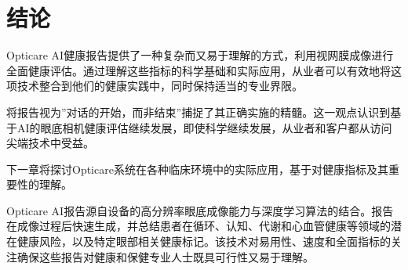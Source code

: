 \documentclass[
  Letterpaper,
]{scrbook}
\begin{document}
\section{结论}\label{ux7ed3ux8bba}

Opticare
AI健康报告提供了一种复杂而又易于理解的方式，利用视网膜成像进行全面健康评估。通过理解这些指标的科学基础和实际应用，从业者可以有效地将这项技术整合到他们的健康实践中，同时保持适当的专业界限。

将报告视为''对话的开始，而非结束''捕捉了其正确实施的精髓。这一观点认识到基于AI的眼底相机健康评估继续发展，即使科学继续发展，从业者和客户都从访问尖端技术中受益。

下一章将探讨Opticare系统在各种临床环境中的实际应用，基于对健康指标及其重要性的理解。

Opticare
AI报告源自设备的高分辨率眼底成像能力与深度学习算法的结合。报告在成像过程后快速生成，并总结患者在循环、认知、代谢和心血管健康等领域的潜在健康风险，以及特定眼部相关健康标记。该技术对易用性、速度和全面指标的关注确保这些报告对健康和保健专业人士既具可行性又易于理解。
\end{document}
